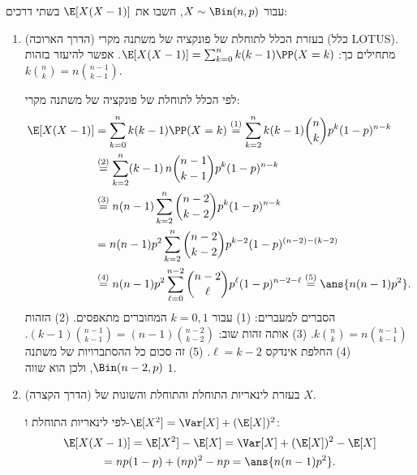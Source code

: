 עבור $X\sim\Bin(n,p)$, חשבו את $\E[X(X-1)]$ בשתי דרכים:
\begin{enumerate}
\item (הדרך הארוכה) בעזרת הכלל לתוחלת של פונקציה של משתנה מקרי (כלל \textenglish{LOTUS}). מתחילים כך:
$\E[X(X-1)]=\sum_{k=0}^nk(k-1)\PP(X=k)$. אפשר להיעזר בזהות $k\binom nk=n\binom{n-1}{k-1}$.
\begin{solbox}
\unverified
לפי הכלל לתוחלת של פונקציה של משתנה מקרי:
\[
\begin{split}
\E[X(X-1)]&=\sum_{k=0}^nk(k-1)\PP(X=k)\overset{(1)}=\sum_{k=2}^nk(k-1)\binom nkp^k(1-p)^{n-k}\\
&\overset{(2)}=\sum_{k=2}^n(k-1)\,n\binom{n-1}{k-1}p^k(1-p)^{n-k}\\
&\overset{(3)}=n(n-1)\sum_{k=2}^n\binom{n-2}{k-2}p^k(1-p)^{n-k}
\\&=n(n-1)p^2\sum_{k=2}^n\binom{n-2}{k-2}p^{k-2}(1-p)^{(n-2)-(k-2)}\\
&\overset{(4)}=n(n-1)p^2\sum_{\ell=0}^{n-2}\binom{n-2}\ell p^\ell(1-p)^{n-2-\ell}\overset{(5)}=\ans{n(n-1)p^2}.
\end{split}
\]
הסברים למעברים:
(1) עבור $k=0,1$ המחוברים מתאפסים.
(2) הזהות $k\binom nk=n\binom{n-1}{k-1}$.
(3) אותה זהות שוב: $(k-1)\binom{n-1}{k-1}=(n-1)\binom{n-2}{k-2}$.
(4) החלפת אינדקס $\ell=k-2$.
(5) זה סכום כל ההסתברויות של משתנה $\Bin(n-2,p)$, ולכן הוא שווה $1$.
\end{solbox}
\item (הדרך הקצרה) בעזרת לינאריות התוחלת והתוחלת והשונות של $X$.
\begin{solbox}
\unverified
לפי לינאריות התוחלת ו-$\E[X^2]=\Var[X]+(\E[X])^2$:
\begin{multline*}
\E[X(X-1)]=\E[X^2]-\E[X]=\Var[X]+(\E[X])^2-\E[X]\\
=np(1-p)+(np)^2-np=\ans{n(n-1)p^2}.
\end{multline*}
\end{solbox}
\end{enumerate}
